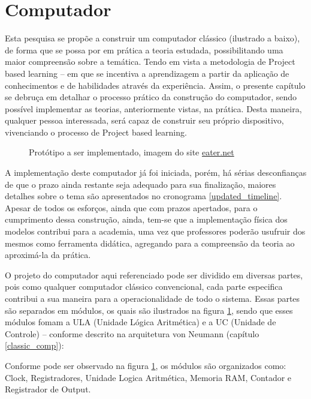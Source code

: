 \section{Computador} 
\label{computer}
Esta pesquisa se propõe a construir um computador clássico (ilustrado a baixo), de forma que se possa por em prática a teoria estudada, possibilitando uma maior compreensão sobre a temática. Tendo em vista a metodologia de Project based learning – em que se incentiva a aprendizagem a partir da aplicação de conhecimentos e de habilidades através da experiência. Assim, o presente capítulo se debruça em detalhar o processo prático da construção do computador, sendo possível implementar as teorias, anteriormente vistas, na prática. Desta maneira, qualquer pessoa interessada, será capaz de construir seu próprio dispositivo, vivenciando o processo de Project based learning. 

\vspace{1cm}
\begin{figure}[H] \centering 
  \caption{\label{breadboard_computer} Protótipo a ser implementado, imagem do site \href{https://eater.net/}{eater.net}} 
\end{figure}

A implementação deste computador já foi iniciada, porém, há sérias desconfianças de que o prazo ainda restante seja adequado para sua finalização, maiores detalhes sobre o tema são apresentados no cronograma \ref{updated_timeline}. Apesar de todos os esforços, ainda que com prazos apertados, para o cumprimento dessa construção, ainda, tem-se que a implementação física dos modelos contribui para a academia, uma vez que professores poderão usufruir dos mesmos como ferramenta didática, agregando para a compreensão da teoria ao aproximá-la da prática.

O projeto do computador aqui referenciado pode ser dividido em diversas partes, pois como qualquer computador clássico convencional, cada parte especifica contribui a sua maneira para a operacionalidade de todo o sistema. Essas partes são separados em módulos, os quais são ilustrados na figura \ref{breadboard_computer}, sendo que esses módulos fomam a ULA (Unidade Lógica Aritmética) e a UC (Unidade de Controle) – conforme descrito na arquitetura von Neumann (capítulo \ref{classic_comp}):

Conforme pode ser observado na figura \ref{breadboard_computer}, os módulos são organizados como: Clock, Registradores, Unidade Logica Aritmética, Memoria RAM, Contador e Registrador de Output.

